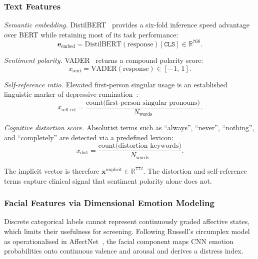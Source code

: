 \documentclass[12pt]{article}
\begin{document}
\subsubsection{Text Features}

\emph{Semantic embedding.} DistilBERT~\cite{sanh2019distilbert} provides
a six-fold inference speed advantage over BERT while retaining most of
its task performance:
\begin{equation}
\mathbf{e}_{\text{embed}} = \text{DistilBERT}(\text{response})[\texttt{CLS}]
\in \mathbb{R}^{768}.
\end{equation}

\emph{Sentiment polarity.} VADER~\cite{hutto2014vader} returns a
compound polarity score:
\begin{equation}
x_{\text{sent}} = \text{VADER}(\text{response}) \in [-1,\,1].
\end{equation}

\emph{Self-reference ratio.} Elevated first-person singular usage is an
established linguistic marker of depressive
rumination~\cite{coppersmith2015mental}:
\begin{equation}
x_{\text{self\_ref}}
= \frac{\text{count(first-person singular pronouns)}}
       {N_{\text{words}}} .
\end{equation}

\emph{Cognitive distortion score.} Absolutist terms such as ``always'',
``never'', ``nothing'', and ``completely'' are detected via a predefined
lexicon:
\begin{equation}
x_{\text{dist}}
= \frac{\text{count(distortion keywords)}}{N_{\text{words}}} .
\end{equation}

\noindent The implicit vector is therefore
$\mathbf{x}^{\text{implicit}}\in\mathbb{R}^{772}$. The distortion and
self-reference terms capture clinical signal that sentiment polarity
alone does not.

\subsubsection{Facial Features via Dimensional Emotion Modeling}

Discrete categorical labels cannot represent continuously graded
affective states, which limits their usefulness for screening. Following
Russell's circumplex model~\cite{russell1980circumplex} as operationalised
in AffectNet~\cite{mollahosseini2017affectnet}, the facial component maps
CNN emotion probabilities onto continuous valence and arousal and
derives a distress index.
\end{document}
